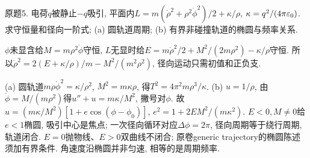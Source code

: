 \begin{exercise}
原题5. 电荷$q$被静止$-q$吸引, 平面内$L=m(\dot\rho^2+\rho^2\dot\phi^2)/2+\kappa/\rho$, $\kappa=q^2/(4\pi\varepsilon_0)$. 求守恒量和径向一阶式; (a) 圆轨道周期; (b) 有界非碰撞轨道的椭圆与频率关系.
\end{exercise}
\begin{solution}
$\phi$未显含给$M=m\rho^2\dot\phi$守恒, $L$无显时给$E=m\dot\rho^2/2+M^2/(2m\rho^2)-\kappa/\rho$守恒. 所以$\dot\rho^2=2(E+\kappa/\rho)/m-M^2/(m^2\rho^2)$, 径向运动只需初值和正负支.

(a) 圆轨道$m\rho\dot\phi^2=\kappa/\rho^2$, $M^2=m\kappa\rho$, 得$T^2=4\pi^2m\rho^3/\kappa$. (b) $u=1/\rho$, 由$\dot\phi=M/(m\rho^2)$得$u''+u=m\kappa/M^2$, 撇号对$\phi$. 故$u=(m\kappa/M^2)[1+e\cos(\phi-\phi_0)]$, $e^2=1+2EM^2/(m\kappa^2)$. $E<0,M\ne0$给$e<1$椭圆, 吸引中心是焦点; 一次径向循环对应$\Delta\phi=2\pi$, 径向周期等于绕行周期, 轨道闭合. $E=0$抛物线、$E>0$双曲线不闭合; 原卷generic trajectory的椭圆陈述须加有界条件. 角速度沿椭圆并非匀速, 相等的是周期频率.
\end{solution}
